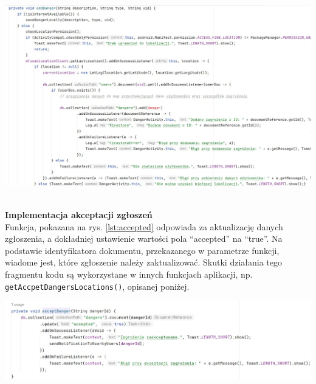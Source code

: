 \noindent
\begin{minipage}{\linewidth}
    \label{lst:danger}
    \centering
    \includegraphics[width=0.8\linewidth]{img/kod/imp-adddanger.jpg}
\end{minipage}
\\

\textbf{Implementacja akceptacji zgłoszeń} \\ 
Funkcja, pokazana na rys. \ref{lst:accepted} odpowiada za aktualizację danych zgłoszenia, a dokładniej ustawienie wartości pola “accepted” na “true”. Na podstawie identyfikatora dokumentu, przekazanego w parametrze funkcji, wiadome jest, które zgłoszenie należy zaktualizować. Skutki działania tego fragmentu kodu są wykorzystane w innych funkcjach aplikacji, np. \verb|getAccpetDangersLocations()|, opisanej poniżej.

\noindent
\begin{minipage}{\linewidth}
    \label{lst:accepted}
    \centering
    \includegraphics[width=0.8\linewidth]{img/kod/imp-acceptdanger.jpg}
\end{minipage}

